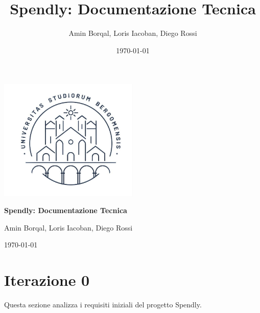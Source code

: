 \documentclass{softwaredoc}
\title{Spendly: Documentazione Tecnica}
\author{Amin Borqal, Loris Iacoban, Diego Rossi}
\date{\today}
\begin{document}
\begin{titlepage}
  \centering
  \vspace*{2cm} %

  \includegraphics[width=0.5\textwidth]{images/Marchio.jpg}\par
  \vspace{1cm}
  
  {\Huge \bfseries Spendly: Documentazione Tecnica\par}
  \vspace{1cm}
  
  {\Large Amin Borqal, Loris Iacoban, Diego Rossi\par}
  \vspace{1cm}
  
  {\Large \today\par}
  \vfill
\end{titlepage}

\tableofcontents
{} %
\newpage
\listoffigures
\listoftables
\newpage 

\section{Iterazione 0}
Questa sezione analizza i requisiti iniziali del progetto Spendly.


\newpage

\newpage



\newpage

\newpage

\end{document}
